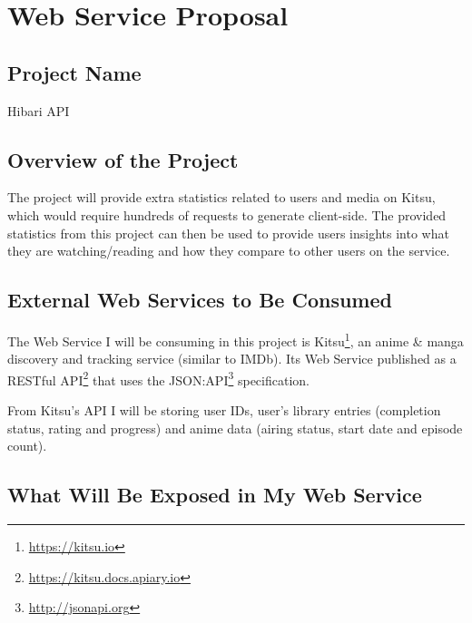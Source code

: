 \chapter{Web Service Proposal}
\section{Project Name}

Hibari API

\section{Overview of the Project}

The project will provide extra statistics related to users and media on Kitsu, which would require hundreds of requests to generate client-side. The provided statistics from this project can then be used to provide users insights into what they are watching/reading and how they compare to other users on the service.

\section{External Web Services to Be Consumed}

The Web Service I will be consuming in this project is Kitsu\footnote{\url{https://kitsu.io}}, an anime \& manga discovery and tracking service (similar to IMDb). Its Web Service published as a RESTful API\footnote{\url{https://kitsu.docs.apiary.io}} that uses the JSON:API\footnote{\url{http://jsonapi.org}} specification.

From Kitsu's API I will be storing user IDs, user's library entries (completion status, rating and progress) and anime data (airing status, start date and episode count).

\newpage
\section{What Will Be Exposed in My Web Service}


